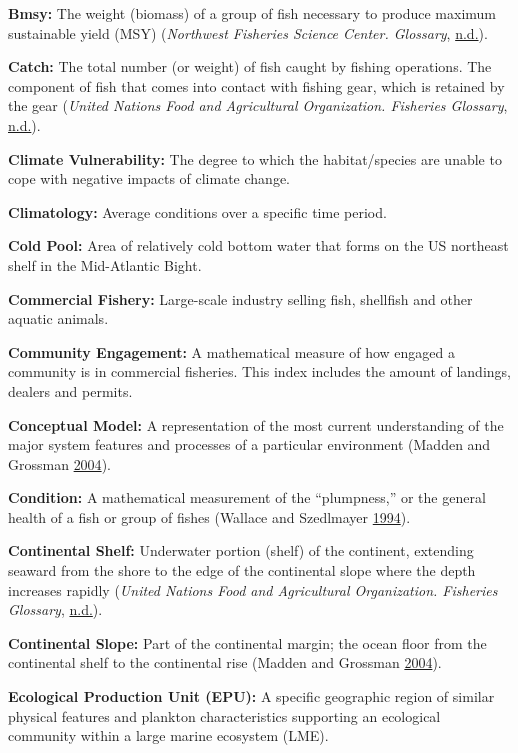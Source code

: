 \documentclass[
]{book}
\begin{document}
\textbf{Bmsy:}
The weight (biomass) of a group of fish necessary to produce maximum sustainable yield (MSY) (\emph{Northwest Fisheries Science Center. Glossary}, \protect\hyperlink{ref-nwfsc}{n.d.}).

\textbf{Catch:}
The total number (or weight) of fish caught by fishing operations. The component of fish that comes into contact with fishing gear, which is retained by the gear (\emph{United Nations Food and Agricultural Organization. Fisheries Glossary}, \protect\hyperlink{ref-unfao}{n.d.}).

\textbf{Climate Vulnerability:}
The degree to which the habitat/species are unable to cope with negative impacts of climate change.

\textbf{Climatology:}
Average conditions over a specific time period.

\textbf{Cold Pool:}
Area of relatively cold bottom water that forms on the US northeast shelf in the Mid-Atlantic Bight.

\textbf{Commercial Fishery:}
Large-scale industry selling fish, shellfish and other aquatic animals.

\textbf{Community Engagement:}
A mathematical measure of how engaged a community is in commercial fisheries. This index includes the amount of landings, dealers and permits.

\textbf{Conceptual Model:}
A representation of the most current understanding of the major system features and processes of a particular environment (Madden and Grossman \protect\hyperlink{ref-madden2004}{2004}).

\textbf{Condition:}
A mathematical measurement of the ``plumpness,'' or the general health of a fish or group of fishes (Wallace and Szedlmayer \protect\hyperlink{ref-wallace1994}{1994}).

\textbf{Continental Shelf:}
Underwater portion (shelf) of the continent, extending seaward from the shore to the edge of the continental slope where the depth increases rapidly (\emph{United Nations Food and Agricultural Organization. Fisheries Glossary}, \protect\hyperlink{ref-unfao}{n.d.}).

\textbf{Continental Slope:}
Part of the continental margin; the ocean floor from the continental shelf to the continental rise (Madden and Grossman \protect\hyperlink{ref-madden2004}{2004}).

\textbf{Ecological Production Unit (EPU):}
A specific geographic region of similar physical features and plankton characteristics supporting an ecological community within a large marine ecosystem (LME).
\end{document}
